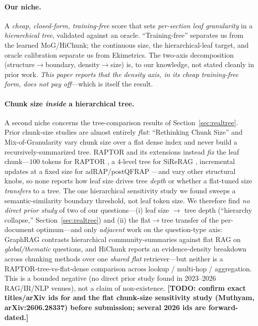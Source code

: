 \documentclass[11pt]{article}
\newcommand{\todo}[1]{{\color{red}\textbf{[TODO: #1]}}}
\begin{document}
\paragraph{Our niche.} A \emph{cheap, closed-form, training-free} score that sets
\emph{per-section leaf granularity} in a \emph{hierarchical tree}, validated
against an oracle. ``Training-free'' separates us from the learned MoG/HiChunk;
the continuous size, the hierarchical-leaf target, and oracle calibration
separate us from Ekimetrics. The two-axis decomposition (structure$\to$boundary,
density$\to$size) is, to our knowledge, not stated cleanly in prior work.
\emph{This paper reports that the density axis, in its cheap training-free form,
does not pay off}---which is itself the result.

\paragraph{Chunk size \emph{inside} a hierarchical tree.} A second niche concerns the
tree-comparison results of Section~\ref{sec:realtree}. Prior chunk-size studies are almost
entirely \emph{flat}: ``Rethinking Chunk Size'' \cite{rethink2025} and Mix-of-Granularity
\cite{mog2024} vary chunk size over a flat dense index and never build a recursively-summarized
tree. RAPTOR and its extensions instead \emph{fix} the leaf chunk---$100$ tokens for RAPTOR
\cite{sarthi2024raptor}, a $4$-level tree for SiReRAG \cite{sirerag}, incremental updates at a
fixed size for adRAP/postQFRAP \cite{adrap}---and vary other structural knobs, so none reports how
leaf size drives tree \emph{depth} or whether a flat-tuned size \emph{transfers} to a tree. The
one hierarchical sensitivity study we found \cite{enhancingraptor} sweeps a semantic-similarity
boundary threshold, not leaf token size. We therefore find \emph{no direct prior study} of two of
our questions---(i) leaf size $\to$ tree depth (``hierarchy collapse,'' Section~\ref{sec:realtree})
and (ii) the flat$\to$tree transfer of the per-document optimum---and only \emph{adjacent} work on
the question-type axis: GraphRAG \cite{graphrag} contrasts hierarchical community-summaries against
flat RAG on \emph{global/thematic} questions, and HiChunk \cite{hichunk2025} reports an
evidence-density breakdown across chunking methods over one \emph{shared flat} retriever---but
neither is a RAPTOR-tree-vs-flat-dense comparison across lookup / multi-hop / aggregation. This is
a bounded negative (no direct prior study found in 2023--2026 RAG/IR/NLP venues), not a claim of
non-existence. \todo{confirm exact titles/arXiv ids for \cite{adrap} and the flat chunk-size
sensitivity study (Muthyam, arXiv:2606.28337) before submission; several 2026 ids are forward-dated.}
\end{document}
